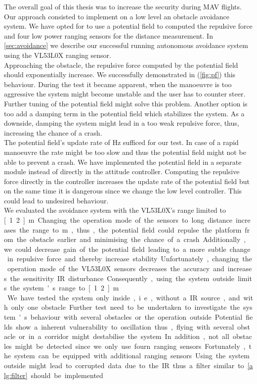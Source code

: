 The overall goal of this thesis was to increase the security during MAV flights. Our approach consisted to implement on a low level an obstacle avoidance system. We have opted for to use a potential field to computed the repulsive force and four low power ranging sensors for the distance measurement. In \cref{sec:avoidance} we describe our successful running autonomous avoidance system using the VL53L0X ranging sensor. \\
Approaching the obstacle, the repulsive force computed by the potential field should exponentially increase. We successfully demonstrated in (\cref{fig:pf}) this behaviour. During the test it became apparent, when the manoeuvre is too aggressive the system might become unstable and the user has to counter steer. Further tuning of the potential field might solve this problem. Another option is too add a damping term in the potential field which stabilizes the system. As a downside, damping the system might lead in a too weak repulsive force, thus, increasing the chance of a crash.\\
The potential field's update rate of \unit[5]{Hz} sufficed for our test. In case of a rapid manoeuvre the rate might be too slow and thus the potential field might not be able to prevent a crash. We have implemented the potential field in a separate module instead of directly in the attitude controller. Computing the repulsive force directly in the controller increases the update rate of the potential field but on the same time it is dangerous since we change the low level controller. This could lead to undesired behaviour. \\

We evaluated the avoidance system with the VL53L0X's range limited to \unit[1.2]{m}. Changing the operation mode of the sensors to long distance increases the range to \unit[2]{m}, thus, the potential field could repulse the platform from the obstacle earlier and minimising the chance of a crash. Additionally, we could decrease gain of the potential field leading to a more subtle change in repulsive force and thereby increase stability. Unfortunately, changing the operation mode of the VL53L0X sensors decreases the accuracy and increases the sensitivity IR disturbance. Consequently, using the system outside limits the system's range to \unit[1.2]{m}.\\
We have tested the system only inside, i.e., without a IR source, and with only one obstacle. Further test need to be undertaken to investigate the system's behaviour with several obstacles or the operation outside. Potential fields show a inherent vulnerability to oscillation thus, flying with several obstacle or in a corridor might destabilise the system. In addition, not all obstacles might be detected since we only use fourn ranging sensors. Fortunately, the system can be equipped with additional ranging sensors. Using the system outside might lead to corrupted data due to the IR thus a filter similar to \cref{alg:filter} should be implemented.\\